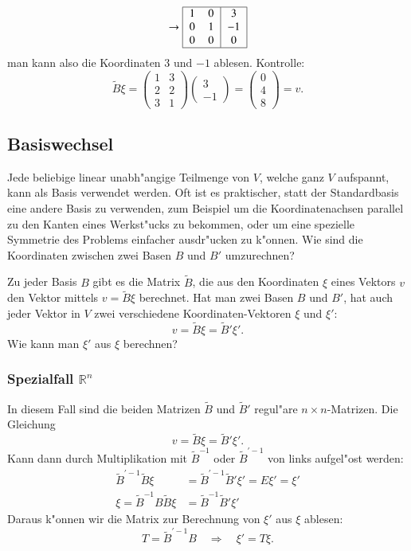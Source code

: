\begin{beispiel}
\[\rightarrow
\begin{tabular}{|>{$}c<{$}>{$}c<{$}|>{$}c<{$}|}
\hline
1&0&3\\
0&1&-1\\
0&0&0\\
\hline
\end{tabular}
\]
man kann also die Koordinaten $3$ und $-1$ ablesen.
Kontrolle:
\[
\tilde B\xi
=
\begin{pmatrix}
1&3\\
2&2\\
3&1\end{pmatrix}
\begin{pmatrix}3\\-1\end{pmatrix}
=\begin{pmatrix}
0\\4\\8
\end{pmatrix}
=v.
\]
\end{beispiel}

\subsection{Basiswechsel}
Jede beliebige linear unabh"angige Teilmenge von $V$, welche ganz $V$
aufspannt, kann als Basis verwendet werden. Oft ist es praktischer,
statt der Standardbasis eine andere Basis zu verwenden, zum Beispiel
um die Koordinatenachsen parallel zu den Kanten eines Werkst"ucks zu
bekommen, oder um eine spezielle Symmetrie des Problems einfacher
ausdr"ucken zu k"onnen. Wie sind die Koordinaten zwischen zwei Basen
$B$ und $B'$ umzurechnen?

Zu jeder Basis $B$ gibt es die Matrix $\tilde B$, die aus den
Koordinaten $\xi$ eines Vektors $v$ den Vektor mittels $v=\tilde B\xi$
berechnet. Hat man zwei Basen $B$ und $B'$, hat auch jeder Vektor
in $V$ zwei verschiedene Koordinaten-Vektoren $\xi$ und $\xi'$:
\[
v=\tilde B\xi =\tilde B'\xi'.
\]
Wie kann man $\xi'$ aus $\xi$ berechnen?

\subsubsection{Spezialfall $\mathbb R^n$}
In diesem Fall sind die beiden Matrizen $\tilde B$ und $\tilde B'$
regul"are $n\times n$-Matrizen. Die Gleichung
\[
v=\tilde B\xi =\tilde B'\xi'.
\]
Kann dann durch Multiplikation mit $\tilde B^{-1}$ oder $\tilde B^{\prime-1}$
von links aufgel"ost werden:
\begin{align*}
\tilde B^{\prime-1}\tilde B\xi&= \tilde B^{\prime -1}\tilde B'\xi'=E\xi'=\xi'\\
\xi=\tilde B^{-1}B\tilde B\xi&=\tilde B^{-1}\tilde B'\xi'
\end{align*}
Daraus k"onnen wir die Matrix zur Berechnung von $\xi'$ aus $\xi$
ablesen: 
\[
T=\tilde B^{\prime-1}B \quad\Rightarrow\quad
\xi'=T\xi.
\]

